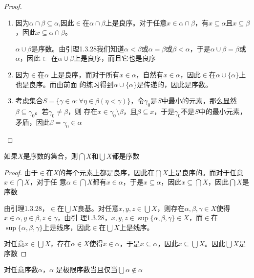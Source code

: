 \documentclass[11pt]{article}
\begin{document}
\begin{proof}
\begin{enumerate}
\item 因为\(\alpha\cap\beta\subseteq\alpha\),因此\(\in\)在\(\alpha\cap\beta\)上是良序。对于任意\(x\in\alpha\cap\beta\)，有\(x\subseteq\alpha\)且\(x\subseteq\beta\)，因此\(x\subseteq\alpha\cap\beta\)。

\(\alpha\cup\beta\)是序数。由引理1.3.28我们知道\(\alpha<\beta\)或\(\alpha=\beta\)或\(\beta<\alpha\)，于是\(\alpha\cup\beta=\beta\)或\(\alpha\)，因此\(\in\)
在\(\alpha\cup\beta\)上是良序，而且它也是良序

\item 因为\(\in\)在\(\alpha\) 上是良序，而对于所有\(x\in\alpha\)，自然有\(x\in\alpha\)，因此\(\in\)在\(\alpha\cup\{\alpha\}\)上也是良序。而由前面
的练习得到\(\alpha\cup\{\alpha\}\)是传递的，因此是序数。

\item 考虑集合\(S=\{\gamma\in\alpha:\forall \eta\in\beta(\eta<\gamma)\}\)，令\(\gamma_0\)是\(S\)中最小的元素，那么显然\(\beta\subseteq\gamma_0\)。若\(\gamma_0\neq\beta\)，则
存在\(x\in\gamma_0\setminus\beta\)，且\(\beta\subseteq x\)，于是\(\gamma_0\)不是\(S\)中的最小元素，矛盾，因此\(\beta=\gamma_0\in\alpha\)
\end{enumerate}
\end{proof}

\begin{exercise}[1.3.33]
如果\(X\)是序数的集合，则\(\bigcap X\)和\(\bigcup X\)都是序数
\end{exercise}

\begin{proof}
由于\(\in\)在\(X\)的每个元素上都是良序，因此在\(\bigcap X\)上是良序的。而对于任意\(x\in\bigcap X\)，对于任
意\(\alpha\in\bigcap X\)都有\(x\in\alpha\)，于是\(x\subseteq\alpha\)，因此\(x\subseteq\bigcap X\)，因此\(\bigcap X\)是序数

由引理1.3.28，\(\in\)在\(\bigcup X\)良基。对任意\(x,y,z\in\bigcup X\)，则存在\(\alpha,\beta,\gamma\in X\)使得\(x\in\alpha,y\in\beta,z\in\gamma\)，由引
理1.3.28，\(x,y,z\in\sup\{\alpha,\beta,\gamma\}\in X\)，而\(\in\)在\(\sup\{\alpha,\beta,\gamma\}\)上是线序，因此\(\in\)在\(\bigcup X\)上是线序。

对任意\(x\in\bigcup X\)，存在\(\alpha\in X\)使得\(x\in\alpha\)，于是\(x\subseteq\alpha\)，因此\(x\subseteq\bigcup X\)。因此\(\bigcup X\)是序数
\end{proof}

\begin{exercise}[1.3.34]
对任意序数\(\alpha\)，\(\alpha\) 是极限序数当且仅当\(\bigcup\alpha\notin\alpha\)
\end{exercise}
\end{document}
